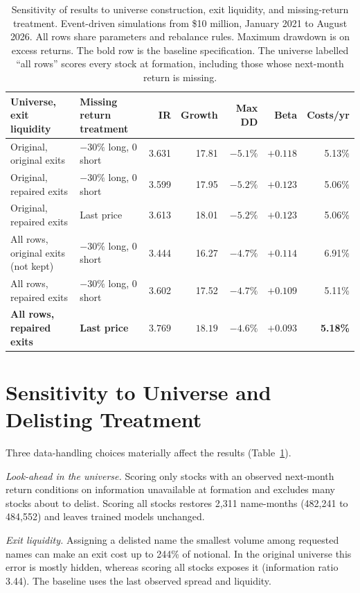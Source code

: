 \documentclass[10pt,twocolumn,letterpaper]{article}
\begin{document}
\begin{table}[t]
\centering
\caption{Sensitivity of results to universe construction, exit liquidity, and missing-return treatment. Event-driven simulations from \$10 million, January 2021 to August 2026. All rows share parameters and rebalance rules. Maximum drawdown is on excess returns. The bold row is the baseline specification. The universe labelled ``all rows'' scores every stock at formation, including those whose next-month return is missing.}
\label{tab:audit}
\footnotesize
\setlength{\tabcolsep}{5pt}
\begin{tabular}{llrrrrr}
\toprule
Universe, exit liquidity & Missing return treatment & IR & Growth & Max DD & Beta & Costs/yr \\
\midrule
Original, original exits & $-30\%$ long, 0 short & 3.631 & 17.81 & $-5.1\%$ & $+0.118$ & 5.13\% \\
Original, repaired exits & $-30\%$ long, 0 short & 3.599 & 17.95 & $-5.2\%$ & $+0.123$ & 5.06\% \\
Original, repaired exits & Last price & 3.613 & 18.01 & $-5.2\%$ & $+0.123$ & 5.06\% \\
All rows, original exits (not kept) & $-30\%$ long, 0 short & 3.444 & 16.27 & $-4.7\%$ & $+0.114$ & 6.91\% \\
All rows, repaired exits & $-30\%$ long, 0 short & 3.602 & 17.52 & $-4.7\%$ & $+0.109$ & 5.11\% \\
\textbf{All rows, repaired exits} & \textbf{Last price} & $\mathbf{3.769}$ & $\mathbf{18.19}$ & $\mathbf{-4.6\%}$ & $\mathbf{+0.093}$ & \textbf{5.18\%} \\
\bottomrule
\end{tabular}
\end{table}

\section{Sensitivity to Universe and Delisting Treatment}

Three data-handling choices materially affect the results (Table~\ref{tab:audit}).

\textit{Look-ahead in the universe.} Scoring only stocks with an observed next-month return conditions on information unavailable at formation and excludes many stocks about to delist. Scoring all stocks restores 2,311 name-months (482,241 to 484,552) and leaves trained models unchanged.

\textit{Exit liquidity.} Assigning a delisted name the smallest volume among requested names can make an exit cost up to 244\% of notional. In the original universe this error is mostly hidden, whereas scoring all stocks exposes it (information ratio 3.44). The baseline uses the last observed spread and liquidity.
\end{document}
